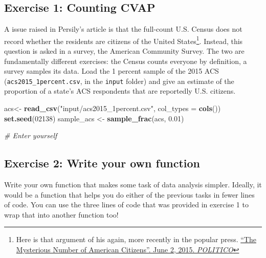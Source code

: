 \documentclass[]{book}
\newenvironment{Shaded}{\begin{snugshade}}{\end{snugshade}}
\newcommand{\CommentTok}[1]{\textcolor[rgb]{0.56,0.35,0.01}{\textit{#1}}}
\newcommand{\DataTypeTok}[1]{\textcolor[rgb]{0.13,0.29,0.53}{#1}}
\newcommand{\DecValTok}[1]{\textcolor[rgb]{0.00,0.00,0.81}{#1}}
\newcommand{\FloatTok}[1]{\textcolor[rgb]{0.00,0.00,0.81}{#1}}
\newcommand{\KeywordTok}[1]{\textcolor[rgb]{0.13,0.29,0.53}{\textbf{#1}}}
\newcommand{\NormalTok}[1]{#1}
\newcommand{\StringTok}[1]{\textcolor[rgb]{0.31,0.60,0.02}{#1}}
\let\rmarkdownfootnote\footnote%
\def\footnote{\protect\rmarkdownfootnote}
\theoremstyle{definition}
\theoremstyle{definition}
\theoremstyle{definition}
\theoremstyle{remark}
\begin{document}
\hypertarget{exercise-1-counting-cvap}{%
\subsection*{Exercise 1: Counting CVAP}\label{exercise-1-counting-cvap}}

A issue raised in Persily's article is that the full-count U.S. Census does not record whether the residents are citizens of the United States\footnote{Here is that argument of his again, more recently in the popular press. \href{http://www.politico.com/magazine/story/2015/06/the-supreme-courts-big-data-problem-118568}{``The Mysterious Number of American Citizens''. June 2, 2015. \emph{POLITICO}}}. Instead, this question is asked in a survey, the American Community Survey. The two are fundamentally different exercises: the Census counts everyone by definition, a survey samples its data. Load the 1 percent sample of the 2015 ACS (\texttt{acs2015\_1percent.csv}, in the \texttt{input} folder) and give an estimate of the proportion of a state's ACS respondents that are reportedly U.S. citizens.

\begin{Shaded}
\begin{Highlighting}[]
\NormalTok{acs<-}\StringTok{ }\KeywordTok{read_csv}\NormalTok{(}\StringTok{"input/acs2015_1percent.csv"}\NormalTok{, }\DataTypeTok{col_types =} \KeywordTok{cols}\NormalTok{())}
\KeywordTok{set.seed}\NormalTok{(}\DecValTok{02138}\NormalTok{)}
\NormalTok{sample_acs <-}\StringTok{ }\KeywordTok{sample_frac}\NormalTok{(acs, }\FloatTok{0.01}\NormalTok{)}

\CommentTok{# Enter yourself}
\end{Highlighting}
\end{Shaded}

\hypertarget{exercise-2-write-your-own-function}{%
\subsection*{Exercise 2: Write your own function}\label{exercise-2-write-your-own-function}}

Write your own function that makes some task of data analysis simpler. Ideally, it would be a function that helps you do either of the previous tasks in fewer lines of code. You can use the three lines of code that was provided in exercise 1 to wrap that into another function too!
\end{document}

